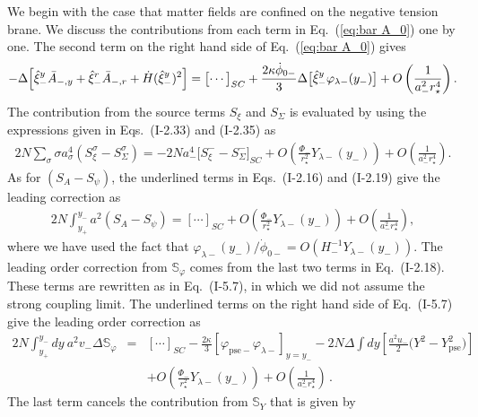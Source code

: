 \documentclass[a4paper,showpacs,preprintnumbers,amsmath,amssymb]{revtex4}
\begin{document}
We begin with the case that matter fields are confined on the negative tension brane. 
We discuss the contributions from each term in Eq.~(\ref{eq:bar A_0}) one by one. 
The second term on the right hand side of Eq.~(\ref{eq:bar A_0}) gives  
\begin{eqnarray}
 -\Delta \Bigl[  {\hat\xi_{-}^y} \bar{A} _{-,y} 
   + {\hat\xi_{-}^r} \bar{A} _{-,r}
   + \dot H ({\hat\xi_{-}^y})^2 
  \Bigr]
=  
   \bigl[ \cdots \bigr]_{SC}
 + \frac{2\kappa \dot\phi_{0-}}{3} 
   \Delta \bigl[\hat\xi^y_-  \varphi_{\lambda-}(y_-) \bigr]
 + O\left(\frac{1}{a_-^2 r_\star^4}\right) .
\label{eq:A2 part-gauge}
\end{eqnarray}
The contribution from the source terms $S_\xi$ and $S_\Sigma$ is evaluated by using the expressions given in Eqs.~(I-2.33) and (I-2.35) as
\begin{eqnarray}
  2N \sum_\sigma \sigma a^4_\sigma ( S_\xi^\sigma - S_\Sigma^\sigma)
=  
   -2N a^4_- \bigl[ S_\xi^- - S_\Sigma^- \bigr]_{SC}
  + O \left(\frac{ \Phi_-}{r_\star^2}Y_{ \lambda-}(y_-)  \right)
  + O\left(\frac{1}{a_-^2 r_\star ^4}\right) .
\end{eqnarray}
As for $(S_A - S_\psi)$, the underlined terms in Eqs.~(I-2.16) and
(I-2.19) give the leading correction as 
\begin{eqnarray}
2N\int_{y_+}^{y_-} a^2  (S_A - S_\psi)
 =   [\cdots]_{SC} 
  + O \left(\frac{\Phi_-}{r_\star^2}Y_{ \lambda -}(y_-)  \right)
  + O\left(\frac{1}{a_-^2 r_\star ^4}\right) , 
\end{eqnarray}
where we have used the fact that $\varphi_{\lambda-}(y_-)/\dot\phi_{0-}
= O(H^{-1}_- Y_{ \lambda-}(y_-))$. 
The leading order correction from $\mathbb{S}_\varphi$ comes from the last two terms in Eq.~(I-2.18). These terms are rewritten as in Eq.~(I-5.7), in which we did not assume the strong coupling limit. The underlined terms on the right hand side of 
Eq.~(I-5.7) give the leading order correction as  
\begin{eqnarray}
 2N \int^{y_{-}}_{y_{+}} dy ~ 
  a^2 v_{-} \Delta {\mathbb S}_{\varphi} 
  &=& 
 [\cdots ]_{SC}  
 - \frac{2\kappa}{3}\left[  \varphi_{ \mathrm{pse} -} \varphi_{ \lambda -} \right]_{y=y_-}
 - 2N \Delta \int dy 
  \left[ \frac{a^2 u_-}{2} \bigl(Y^2 - Y^2_{ \mathrm{pse} } \bigr)  \right] 
\nonumber
\\
 && 
   + O \left(\frac{\Phi_-}{r_\star^2} Y_{ \lambda -}(y_-)  \right)
   + O \left(\frac{1}{a_-^2 r_\star ^4}\right)\,.
\label{eq:A2 part-S_varp}
\end{eqnarray}
The last term cancels the contribution from $\mathbb{S}_Y$ that is given by  
\end{document}
